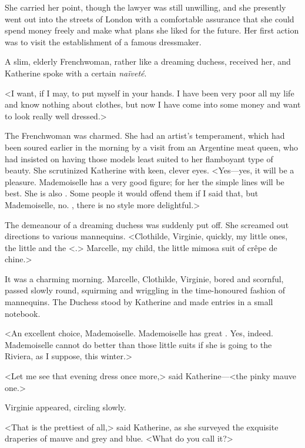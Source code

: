 She carried her point, though the lawyer was still unwilling, and she presently went out into the streets of London with a comfortable assurance that she could spend money freely and make what plans she liked for the future. Her first action was to visit the establishment of a famous dressmaker.

A slim, elderly Frenchwoman, rather like a dreaming duchess, received her, and Katherine spoke with a certain \emph{naïveté}.

<I want, if I may, to put myself in your hands. I have been very poor all my life and know nothing about clothes, but now I have come into some money and want to look really well dressed.>

The Frenchwoman was charmed. She had an artist's temperament, which had been soured earlier in the morning by a visit from an Argentine meat queen, who had insisted on having those models least suited to her flamboyant type of beauty. She scrutinized Katherine with keen, clever eyes. <Yes—yes, it will be a pleasure. Mademoiselle has a very good figure; for her the simple lines will be best. She is also . Some people it would offend them if I said that, but Mademoiselle, no. , there is no style more delightful.>

The demeanour of a dreaming duchess was suddenly put off. She screamed out directions to various mannequins. <Clothilde, Virginie, quickly, my little ones, the little  and the  <.> Marcelle, my child, the little mimosa suit of crêpe de chine.>

It was a charming morning. Marcelle, Clothilde, Virginie, bored and scornful, passed slowly round, squirming and wriggling in the time-honoured fashion of mannequins. The Duchess stood by Katherine and made entries in a small notebook.

<An excellent choice, Mademoiselle. Mademoiselle has great . Yes, indeed. Mademoiselle cannot do better than those little suits if she is going to the Riviera, as I suppose, this winter.>

<Let me see that evening dress once more,> said Katherine—<the pinky mauve one.>

Virginie appeared, circling slowly.

<That is the prettiest of all,> said Katherine, as she surveyed the exquisite draperies of mauve and grey and blue. <What do you call it?>

